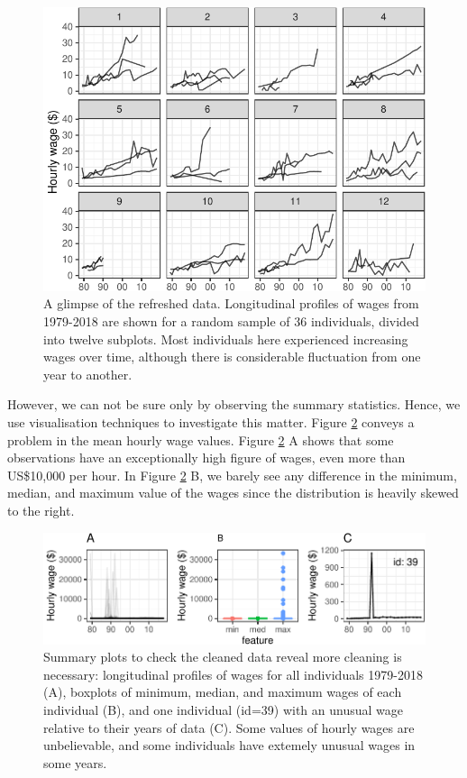 \documentclass[12pt]{article}
\begin{document}
\begin{figure}

{\centering \includegraphics[width=1\linewidth]{figures/sample-plot-1} 

}

\caption{A glimpse of the refreshed data. Longitudinal profiles of wages from 1979-2018 are shown for a random sample of 36 individuals, divided into twelve subplots. Most individuals here experienced increasing wages over time, although there is considerable fluctuation from one year to another.}\label{fig:sample-plot}
\end{figure}

However, we can not be sure only by observing the summary statistics. Hence, we use visualisation techniques to investigate this matter. Figure \ref{fig:feature-plot} conveys a problem in the mean hourly wage values. Figure \ref{fig:feature-plot} A shows that some observations have an exceptionally high figure of wages, even more than US\$10,000 per hour. In Figure \ref{fig:feature-plot} B, we barely see any difference in the minimum, median, and maximum value of the wages since the distribution is heavily skewed to the right.

\begin{figure}

{\centering \includegraphics[width=432px]{figures/feature-plot-1} 

}

\caption{Summary plots to check the cleaned data reveal more cleaning is necessary: longitudinal profiles of wages for all individuals 1979-2018 (A), boxplots of minimum, median, and maximum wages of each individual (B), and one individual (id=39) with an unusual wage relative to their years of data (C). Some values of hourly wages are unbelievable, and some individuals have extemely unusual wages in some years.}\label{fig:feature-plot}
\end{figure}
\end{document}
